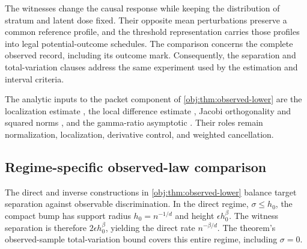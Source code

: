 \documentclass[11pt]{article}
\begin{document}

The witnesses change the causal response while keeping the distribution of stratum and latent dose fixed. Their opposite mean perturbations preserve a common reference profile, and the threshold representation carries those profiles into legal potential-outcome schedules. The comparison concerns the complete observed record, including its outcome mark. Consequently, the separation and total-variation clauses address the same experiment used by the estimation and interval criteria.

The analytic inputs to the packet component of \cref{obj:thm:observed-lower} are the localization estimate \citep[Theorem 2.4, equation (2.14)]{PetrushevXu2005}, the local difference estimate \citep[Theorem 2.2, equation (2.4)]{https://people.math.sc.edu/pencho/Publications/kpx-06-28-06-web.pdf}, Jacobi orthogonality and squared norms \citep[Table 18.3.1, Jacobi row and caption]{https://dlmf.nist.gov/18.3}, and the gamma-ratio asymptotic \citep[equation (5.11.12), positive real axis]{https://dlmf.nist.gov/5.11.E12}. Their roles remain normalization, localization, derivative control, and weighted cancellation.

\subsection{Regime-specific observed-law comparison}

The direct and inverse constructions in \cref{obj:thm:observed-lower} balance target separation against observable discrimination. In the direct regime, \(\sigma\le h_0\), the compact bump has support radius \(h_0=n^{-1/d}\) and height \(\epsilon h_0^\beta\). The witness separation is therefore \(2\epsilon h_0^\beta\), yielding the direct rate \(n^{-\beta/d}\). The theorem's observed-sample total-variation bound covers this entire regime, including \(\sigma=0\).
\end{document}
